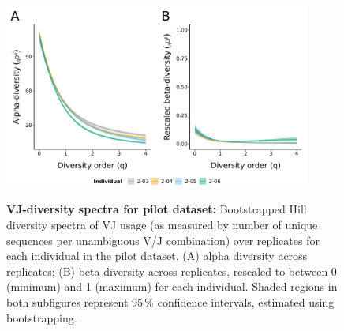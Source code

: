 \begin{figure}
\centering
\includegraphics[width = 0.9\textwidth]{_Figures/png/pilot-vj-diversity}
\begin{subfigure}{0em}
\label{fig:igseq-pilot-vj-diversity-alpha}
\end{subfigure}
\begin{subfigure}{0em}
\label{fig:igseq-pilot-vj-diversity-beta}
\end{subfigure}
\caption[VJ-diversity spectra for \igseq pilot dataset]{\textbf{VJ-diversity spectra for \igseq pilot dataset:} Bootstrapped Hill diversity spectra of VJ usage (as measured by number of unique sequences per unambiguous V/J combination) over replicates for each individual in the pilot dataset. (A) alpha diversity across replicates; (B) beta diversity across replicates, rescaled to between 0 (minimum) and 1 (maximum) for each individual. Shaded regions in both subfigures represent 95\,\% confidence intervals, estimated using bootstrapping.}
\label{fig:igseq-pilot-vj-diversity}
\end{figure}


